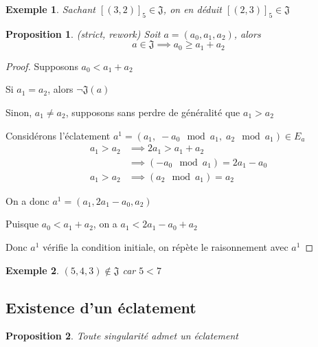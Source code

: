 \documentclass{article}
\newtheorem{proposition}{Proposition}
\newtheorem{example}{Exemple}
\begin{document}
\begin{example}
    Sachant ${[(3, 2)]}_5 \in \mathfrak{J}$, on en déduit ${[(2, 3)]}_5 \in \mathfrak{J}$
\end{example}

\newpage

\begin{proposition}
    (strict, rework) Soit $a=(a_0, a_1, a_2)$, alors
    \[ a \in \mathfrak{J} \implies a_0 \geq a_1 + a_2 \]
\end{proposition}

\begin{proof}
    Supposons $a_0 < a_1 + a_2$

    Si $a_1 = a_2$, alors $\neg \mathfrak{J}(a)$

    Sinon, $a_1 \neq a_2$, supposons sans perdre de généralité que $a_1 > a_2$

    Considérons l'éclatement $a^1 = (a_1,\; -a_0 \mod a_1,\; a_2 \mod a_1) \in E_a$
    \begin{align*}
        a_1 > a_2 & \implies 2a_1 > a_1+a_2               \\
                  & \implies (-a_0 \mod a_1) = 2a_1 - a_0 \\
        a_1 > a_2 & \implies (a_2 \mod a_1) = a_2
    \end{align*}

    On a donc $a^1 = (a_1, 2a_1-a_0, a_2)$

    Puisque $a_0 < a_1 + a_2$, on a $a_1 < 2a_1 - a_0 + a_2$

    Donc $a^1$ vérifie la condition initiale, on répète le raisonnement avec $a^1$
\end{proof}

\begin{example}
    $(5, 4, 3) \not \in \mathfrak{J}$ car $5 < 7$
\end{example}

\subsection{Existence d'un éclatement}

\begin{proposition}
    Toute singularité admet un éclatement
\end{proposition}
\end{document}
